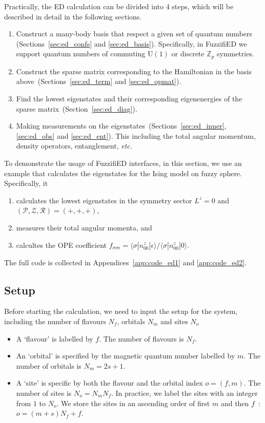 \documentclass{timesjhep}
\begin{document}
Practically, the ED calculation can be divided into 4 steps, which will be described in detail in the following sections. 
\begin{enumerate}
    \item Construct a many-body basis that respect a given set of quantum numbers (Sections~\ref{sec:ed_confs} and \ref{sec:ed_basis}). Specifically, in FuzzifiED we support quantum numbers of commuting $\mathrm{U}(1)$ or discrete $\mathbb{Z}_p$ symmetries.
    \item Construct the sparse matrix corresponding to the Hamiltonian in the basis above~(Sections~\ref{sec:ed_term} and \ref{sec:ed_opmat}). 
    \item Find the lowest eigenstates and their corresponding eigenenergies of the sparse matrix~(Section~\ref{sec:ed_diag}).
    \item Making measurements on the eigenstates~(Sections~\ref{sec:ed_inner}, \ref{sec:ed_obs} and \ref{sec:ed_ent}). This including the total angular momentum, density operators, entanglement, \textit{etc.}
\end{enumerate}

To demonstrate the usage of FuzzifiED interfaces, in this section, we use an example that calculates the eigenstates for the Ising model on fuzzy sphere. Specifically, it
\begin{enumerate}
    \item calculates the lowest eigenstates in the symmetry sector $L^z=0$ and $(\mathcal{P},\mathcal{Z},\mathcal{R})=(+,+,+)$,
    \item measures their total angular momenta, and 
    \item calcultes the OPE coefficient $f_{\sigma\sigma\epsilon}=\langle \sigma|n^z_{00}|\epsilon\rangle/\langle \sigma|n^z_{00}|0\rangle$.
\end{enumerate}
The full code is collected in Appendices~\ref{app:code_ed1} and \ref{app:code_ed2}.

\subsection{Setup}
\label{sec:ed_setup}

Before starting the calculation, we need to input the setup for the system, including the number of flavours $N_f$, orbitals $N_m$ and sites $N_o$ 
\begin{itemize}
    \item A `flavour' is labelled by $f$. The number of flavours is $N_f$.
    \item An `orbital' is specified by the magnetic quantum number labelled by $m$. The number of orbitals is $N_m=2s+1$.
    \item A `site' is specific by both the flavour and the orbital index $o=(f,m)$. The number of sites is $N_o=N_mN_f$. In practice, we label the sites with an integer from $1$ to $N_o$. We store the sites in an ascending order of first $m$ and then $f$~: $o=(m+s)N_f+f$.
\end{itemize}
\end{document}
